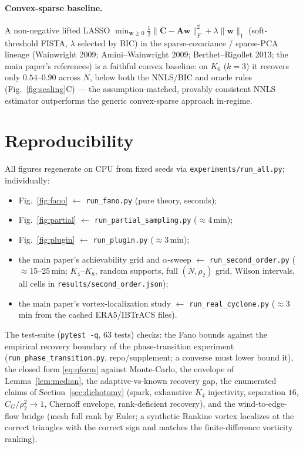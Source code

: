 \documentclass[11pt]{article}
\begin{document}
\paragraph{Convex-sparse baseline.} A non-negative lifted LASSO
$\min_{\bm w\ge0}\tfrac12\|\bm C-\bm A\bm w\|_F^2+\lambda\|\bm w\|_1$
(soft-threshold FISTA, $\lambda$ selected by BIC) in the sparse-covariance /
sparse-PCA lineage (Wainwright 2009; Amini--Wainwright 2009;
Berthet--Rigollet 2013; the main paper's references) is a faithful convex
baseline: on $K_6$ ($k{=}3$) it recovers only
$0.54$--$0.90$ across $N$, below both the NNLS/BIC and oracle rules
(Fig.~\ref{fig:scaling}C) --- the assumption-matched, provably consistent NNLS
estimator outperforms the generic convex-sparse approach in-regime.

\section{Reproducibility}\label{sec:repro}

All figures regenerate on CPU from fixed seeds via
\texttt{experiments/run\_all.py}; individually:
\begin{itemize}\sloppy\setlength\itemsep{0pt}
\item Fig.~\ref{fig:fano} $\leftarrow$ \texttt{run\_fano.py}
  (pure theory, seconds);
\item Fig.~\ref{fig:partial} $\leftarrow$ \texttt{run\_partial\_sampling.py}
  ($\approx$4\,min);
\item Fig.~\ref{fig:plugin} $\leftarrow$ \texttt{run\_plugin.py}
  ($\approx$3\,min);
\item the main paper's achievability grid and $\alpha$-sweep $\leftarrow$
  \texttt{run\_second\_order.py} ($\approx$15--25\,min; $K_4$--$K_8$, random
  supports, full $(N,\rho_2)$ grid, Wilson intervals, all cells in
  \texttt{results/second\_order.json});
\item the main paper's vortex-localization study $\leftarrow$
  \texttt{run\_real\_cyclone.py} ($\approx$3\,min from the cached
  ERA5/IBTrACS files).
\end{itemize}
The test-suite (\texttt{pytest -q}, 63 tests) checks: the Fano bounds against
the empirical recovery boundary of the phase-transition experiment
(\texttt{run\_phase\_transition.py}, repo/supplement; a converse must
lower bound it), the closed form \eqref{eq:qform} against Monte-Carlo, the
envelope of Lemma~\ref{lem:median}, the adaptive-vs-known recovery gap, the
enumerated claims of Section~\ref{sec:dichotomy} (spark, exhaustive $K_4$ injectivity,
separation $16$, $C_G/\rho_2^2\to1$, Chernoff envelope, rank-deficient
recovery), and the wind-to-edge-flow bridge (mesh full rank by Euler; a
synthetic Rankine vortex localizes at the correct triangles with the correct
sign and matches the finite-difference vorticity ranking).
\end{document}
